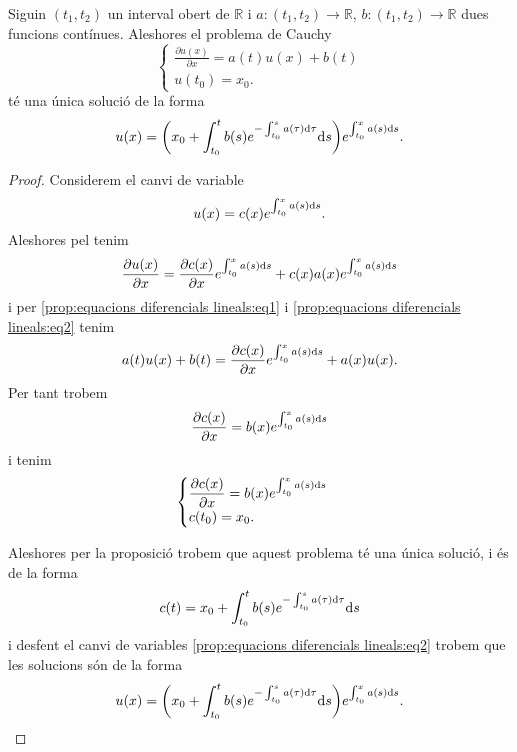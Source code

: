 \documentclass[../Apunts.tex]{subfiles}
\begin{document}
	\begin{proposition}
		\label{prop:equacions diferencials lineals}
		Siguin \((t_{1},t_{2})\) un interval obert de \(\mathbb{R}\) i \(a\colon(t_{1},t_{2})\longrightarrow\mathbb{R}\), \(b\colon(t_{1},t_{2})\longrightarrow\mathbb{R}\) dues funcions contínues. Aleshores el problema de Cauchy
		\begin{equation}
			\label{prop:equacions diferencials lineals:eq1}
			\begin{cases}
				\displaystyle \frac{\partial u(x)}{\partial x}=a(t)u(x)+b(t)\\
				\displaystyle u(t_{0})=x_{0}.
			\end{cases}
		\end{equation}
		té una única solució de la forma
		\[u(x)=\left(x_{0}+\int_{t_{0}}^{t}b(s)e^{-\int_{t_{0}}^{s}a(\tau)\diff \tau}\diff s\right)e^{\int_{t_{0}}^{x}a(s)\diff s}.\]
		\begin{proof}
			Considerem el canvi de variable
			\begin{equation}
				\label{prop:equacions diferencials lineals:eq2}
				u(x)=c(x)e^{\int_{t_{0}}^{x}a(s)\textrm{d} s}.
			\end{equation}
			Aleshores pel  tenim %
			\[\frac{\partial u(x)}{\partial x}=\frac{\partial c(x)}{\partial x}e^{\int_{t_{0}}^{x}a(s)\textrm{d} s}+c(x)a(x)e^{\int_{t_{0}}^{x}a(s)\textrm{d} s}\]
			i per \eqref{prop:equacions diferencials lineals:eq1} i \eqref{prop:equacions diferencials lineals:eq2} tenim
			\[a(t)u(x)+b(t)=\frac{\partial c(x)}{\partial x}e^{\int_{t_{0}}^{x}a(s)\textrm{d} s}+a(x)u(x).\]
			Per tant trobem
			\[\frac{\partial c(x)}{\partial x}=b(x)e^{\int_{t_{0}}^{x}a(s)\textrm{d} s}\]
			i tenim
			\begin{equation}
				\label{prop:equacions diferencials lineals:eq3}
				\begin{cases}
					\displaystyle \frac{\partial c(x)}{\partial x}=b(x)e^{\int_{t_{0}}^{x}a(s)\textrm{d} s}\\
					\displaystyle c(t_{0})=x_{0}.
				\end{cases}
			\end{equation}
			
			Aleshores per la proposició  trobem que aquest problema té una única solució, i és de la forma
			\[c(t)=x_{0}+\int_{t_{0}}^{t}b(s)e^{-\int_{t_{0}}^{s}a(\tau)\textrm{d} \tau}\textrm{d} s\]
			i desfent el canvi de variables \eqref{prop:equacions diferencials lineals:eq2} trobem que les solucions són de la forma
			\[u(x)=\left(x_{0}+\int_{t_{0}}^{t}b(s)e^{-\int_{t_{0}}^{s}a(\tau)\diff \tau}\diff s\right)e^{\int_{t_{0}}^{x}a(s)\diff s}.\qedhere\]
		\end{proof}
	\end{proposition}
\end{document}
